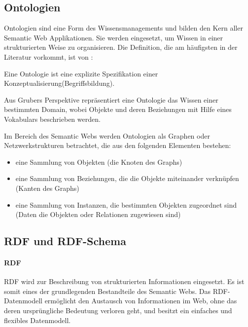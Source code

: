 \subsection{Ontologien}

Ontologien sind eine Form des Wissensmanagements und bilden den Kern aller Semantic Web Applikationen. 
Sie werden eingesetzt, um Wissen in einer strukturierten Weise zu organisieren.
Die Definition, die am häufigsten in der Literatur vorkommt, ist von \citet{gruber_translation_1993}:

\begin{definition}
  Eine Ontologie ist eine explizite Spezifikation einer Konzeptualisierung(Begriffsbildung).
\end{definition}

\noindent Aus Grubers Perspektive repräsentiert eine Ontologie das Wissen einer bestimmten Domain, wobei Objekte und deren Beziehungen mit Hilfe eines Vokabulars beschrieben werden. \citep[vgl.]{breitman_semantic_2007}

Im Bereich des Semantic Webs werden Ontologien als Graphen oder Netzwerkstrukturen betrachtet, die aus den folgenden Elementen bestehen:

\begin{itemize}
	\item eine Sammlung von Objekten (die Knoten des Graphs)
	\item eine Sammlung von Beziehungen, die die Objekte miteinander verknüpfen (Kanten des Graphs)
	\item eine Sammlung von Instanzen, die bestimmten Objekten zugeordnet sind (Daten die Objekten oder Relationen zugewiesen sind) \citep[vgl.]{davies_semantic_2006}
\end{itemize}

\subsection{RDF und RDF-Schema} 

\paragraph{RDF}

\ac{RDF} wird zur Beschreibung von strukturierten Informationen eingesetzt. 
Es ist somit eines der grundlegenden Bestandteile des Semantic Webs.
Das \ac{RDF}-Datenmodell ermöglicht den Austausch von Informationen im Web, ohne das deren ursprüngliche Bedeutung verloren geht, und besitzt ein einfaches und flexibles Datenmodell. \citep[vgl.]{linkeddatavisualization}

